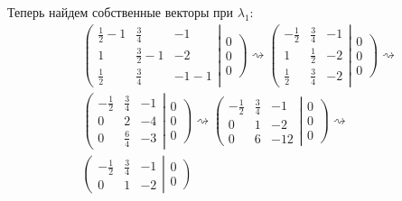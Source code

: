 Теперь найдем собственные векторы при \(\lambda_1\):
\begin{align*}
  &
  \left(
  \begin{matrix}
    \frac{1}{2} - 1 & \frac{3}{4} & -1 \\
    1 & \frac{3}{2} - 1 & -2 \\
    \frac{1}{2} & \frac{3}{4} & -1 - 1
  \end{matrix}
  \right|
  \left. \begin{matrix} 0 \\ 0 \\ 0 \end{matrix} \right)
  \rightsquigarrow
  \left(
  \begin{matrix}
    -\frac{1}{2} & \frac{3}{4} & -1 \\
    1 & \frac{1}{2} & -2 \\
    \frac{1}{2} & \frac{3}{4} & -2
  \end{matrix}
  \right|
  \left. \begin{matrix} 0 \\ 0 \\ 0 \end{matrix} \right)
  \rightsquigarrow \\
  &
  \left(
  \begin{matrix}
    -\frac{1}{2} & \frac{3}{4} & -1 \\
    0 & 2 & -4  \\
    0 & \frac{6}{4} & -3
  \end{matrix}
  \right|
  \left. \begin{matrix} 0 \\ 0 \\ 0 \end{matrix} \right)
  \rightsquigarrow
  \left(
  \begin{matrix}
    -\frac{1}{2} & \frac{3}{4} & -1 \\
    0 & 1 & -2 \\
    0 & 6 & -12
  \end{matrix}
  \right|
  \left. \begin{matrix} 0 \\ 0 \\ 0 \end{matrix} \right)
  \rightsquigarrow \\
  &
  \left(
  \begin{matrix}
    -\frac{1}{2} & \frac{3}{4} & -1 \\
    0 & 1 & -2
  \end{matrix}
  \right|
  \left. \begin{matrix} 0 \\ 0 \end{matrix} \right)

\end{align*}
